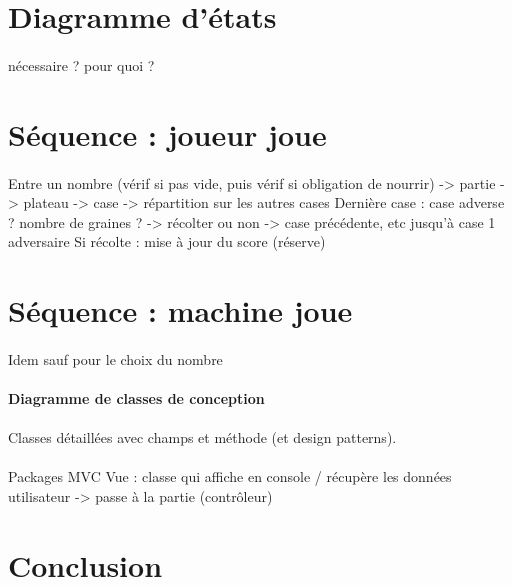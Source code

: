 \documentclass{article}
\begin{document}
    \newpage
    \section{Diagramme d'états}

    \paragraph{}
    nécessaire ? pour quoi ?


    \newpage
    \section{Séquence : joueur joue}

    \paragraph{}
    Entre un nombre (vérif si pas vide, puis vérif si obligation de nourrir) -> partie -> plateau -> case -> répartition sur les autres cases
    Dernière case : case adverse ? nombre de graines ? -> récolter ou non -> case précédente, etc jusqu'à case 1 adversaire
    Si récolte : mise à jour du score (réserve)

    \newpage
    \section{Séquence : machine joue}

    \paragraph{}
    Idem sauf pour le choix du nombre


    \newpage
    \paragraph{Diagramme de classes de conception}

    \paragraph{}
    Classes détaillées avec champs et méthode (et design patterns).

    \paragraph{}
    Packages MVC
    Vue : classe qui affiche en console / récupère les données utilisateur -> passe à la partie (contrôleur)



    
    
    




    \section*{Conclusion}
    \label{sec:concl}
\end{document}
